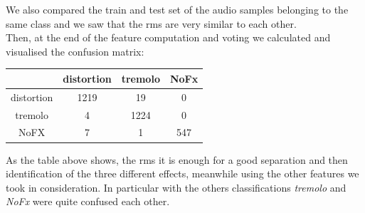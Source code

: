 \documentclass{article}
\begin{document}
We also compared the train and test set of the audio samples belonging to the same class and we saw that the rms are very similar to each other.\\
Then, at the end of the feature computation and voting we calculated and visualised the confusion matrix:
\begin{center}
\begin{tabular}{|c|c|c|c|}
	\hline
	  & distortion & tremolo & NoFx \\
	\hline
	distortion & 1219 & 19 & 0 \\
	\hline
	tremolo & 4 & 1224 & 0 \\
	\hline
	NoFX & 7 & 1 & 547  \\
	\hline
\end{tabular}
\end{center}

As the table above shows, the rms it is enough for a good separation and then identification of the three different effects, meanwhile using the other features we took in consideration. In particular with the others classifications \emph{tremolo} and \emph{NoFx} were quite confused each other.
\end{document}
